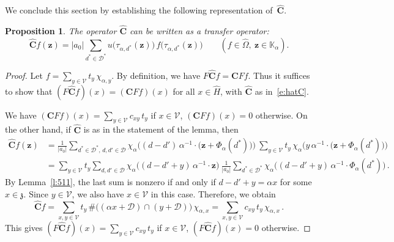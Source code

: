 \documentclass[12pt]{amsart}
\newtheorem{proposition}[lemma]{Proposition}
\theoremstyle{definition}
\theoremstyle{remark}
\numberwithin{equation}{section}
\begin{document}
We conclude this section by establishing the following representation of~$\widehat{\mathbf{C}}$.

\begin{proposition} \label{l:52}
The operator $\widehat{\mathbf{C}}$ can be written as a \emph{transfer operator}:
\begin{equation} \label{e:hatC}
\widehat{\mathbf{C}} f(\mathbf{z}) = |a_0| \sum_{d^*\in\mathcal{D}^*} u\big(\tau_{\alpha,d^*}(\mathbf{z})\big)\, f\big(\tau_{\alpha,d^*}(\mathbf{z})\big) \qquad (f \in \widehat\Omega,\ \mathbf{z} \in \mathbb{K}_\alpha).
\end{equation}
\end{proposition}

\begin{proof}
Let $f = \sum_{y\in\mathcal{V}} t_y\, \chi_{\alpha,y}$.
By definition, we have $F \widehat{\mathbf{C}} f = \mathbf{C} F f$.
Thus it suffices to show that $(F \widehat{\mathbf{C}} f)(x) = (\mathbf{C} F f)(x)$ for all $x \in \widehat{H}$, with $\widehat{\mathbf{C}}$ as in~\eqref{e:hatC}.

We have $(\mathbf{C} F f)(x) = \sum_{y\in\mathcal{V}} c_{x y}\, t_y$ if $x \in \mathcal{V}$, $(\mathbf{C} F f)(x) = 0$ otherwise.
On the other hand, if $\widehat{\mathbf{C}}$ is as in the statement of the lemma, then
\begin{align*}
\widehat{\mathbf{C}} f(\mathbf{z}) & = \frac{1}{|a_0|} \sum_{d^*\in\mathcal{D}^*,\,d,d'\in\mathcal{D}} \chi_\alpha\big((d-d')\, \alpha^{-1} \cdot \big(\mathbf{z} + \Phi_\alpha(d^*)\big)\big) \ \sum_{y\in\mathcal{V}} t_y\, \chi_\alpha\big(y\, \alpha^{-1} \cdot \big(\mathbf{z} + \Phi_\alpha(d^*)\big)\big) \\
& = \sum_{y\in\mathcal{V}} t_y \sum_{d,d'\in\mathcal{D}} \chi_\alpha\big((d-d'+y)\, \alpha^{-1} \cdot \mathbf{z}\big) \ \frac{1}{|a_0|} \sum_{d^*\in\mathcal{D}^*} \chi_\alpha\big((d-d'+y)\, \alpha^{-1} \cdot \Phi_\alpha(d^*)\big)\,.
\end{align*}
By Lemma~\ref{l:511}, the last sum is nonzero if and only if $d-d'+y = \alpha x$ for some $x \in \mathfrak{z}$.
Since $y \in \mathcal{V}$, we also have $x \in \mathcal{V}$ in this case.
Therefore, we obtain
\[
\widehat{\mathbf{C}} f = \sum_{x,y\in\mathcal{V}} t_y\, \#\big((\alpha x + \mathcal{D}) \cap (y + \mathcal{D})\big)\, \chi_{\alpha,x} = \sum_{x,y\in\mathcal{V}} c_{x y}\, t_y\, \chi_{\alpha,x}\,.
\]
This gives $(F \widehat{\mathbf{C}} f)(x) = \sum_{y\in\mathcal{V}} c_{x y}\, t_y$ if $x \in \mathcal{V}$, $(F \widehat{\mathbf{C}} f)(x) = 0$ otherwise.
\end{proof}
\end{document}
